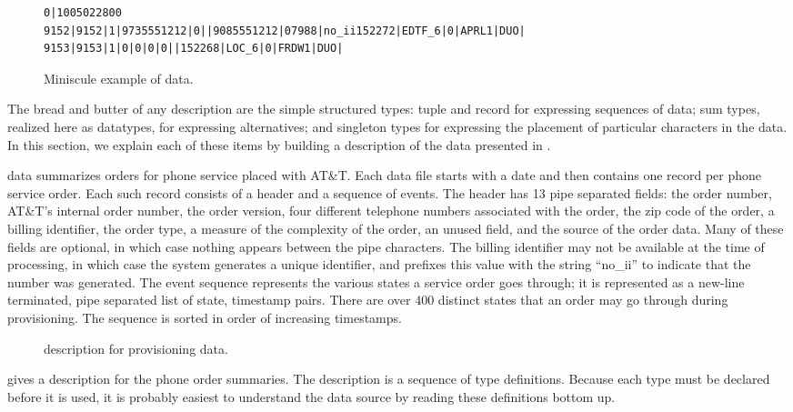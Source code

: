 \begin{figure*}
{\scriptsize
\begin{verbatim}
0|1005022800
9152|9152|1|9735551212|0||9085551212|07988|no_ii152272|EDTF_6|0|APRL1|DUO|
9153|9153|1|0|0|0|0||152268|LOC_6|0|FRDW1|DUO|
\end{verbatim}
}
  \caption{Miniscule example of \dibbler{} data.}
  \label{figure:dibbler-records}
\end{figure*}

The bread and butter of any \padsml{} description are the simple
structured types: tuple and record for expressing sequences of data;
sum types, realized here as datatypes, for expressing alternatives;
and singleton types for expressing the placement of particular
characters in the data.  In this section, we explain each of these
items by building a description of the \dibbler{} data presented in
.

\dibbler{} data summarizes orders for phone service placed with AT\&T.
Each \dibbler{} data file starts with a date and then contains one
record per phone service order.
Each such record consists of a header and a sequence of
events.  The header has 13 pipe separated fields: the order number,
AT\&T's internal order number, the order version, four different
telephone numbers associated with the order, the zip code of the
order, a billing identifier, the order type, a measure of the
complexity of the order, an unused field, and the source of the order
data.  Many of these fields are optional, in which case nothing
appears between the pipe characters.  The billing identifier may not
be available at the time of processing, in which case the system
generates a unique identifier, and prefixes this value with the string
``no\_ii'' to indicate that the number was generated. The event sequence
represents the various states a service order goes through; it is
represented as a new-line terminated, pipe separated list of state,
timestamp pairs.  There are over 400 distinct states that an order may
go through during provisioning.  The sequence is sorted in order of
increasing timestamps.

\begin{figure}
  
  \caption{\padsml{} description for \dibbler{} provisioning data.}
  \label{figure:sirius_pml}
\end{figure}

 gives a \padsml{} description for the
\dibbler{} phone order summaries. The description is a
sequence of type definitions. Because each type must be declared
before it is used, it is probably easiest to understand the
data source by reading these definitions bottom up.

